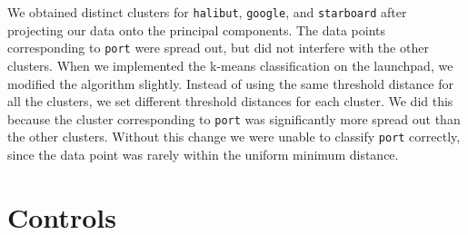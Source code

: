 \documentclass{article}
\newcommand{\port}{\texttt{port}}
\newcommand{\google}{\texttt{google}}
\newcommand{\starboard}{\texttt{starboard}}
\newcommand{\halibut}{\texttt{halibut}}
\begin{document}
We obtained distinct clusters for {\halibut}, {\google}, and {\starboard}
after projecting our data onto the principal components.  The data points
corresponding to {\port} were spread out, but did not interfere with the other
clusters. When we implemented the k-means classification on the
launchpad, we modified the algorithm slightly. Instead of using the same
threshold distance for all the clusters, we set different threshold distances
for each cluster. We did this because the cluster corresponding to {\port} was
significantly more spread out than the other clusters. Without this change we
were unable to classify {\port} correctly, since the data point was rarely
within the uniform minimum distance.

\section*{Controls}
\end{document}
